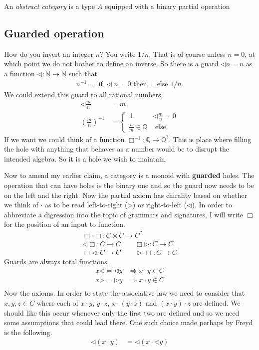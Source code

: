 \documentclass[12pt,twoside,letterpaper]{memoir}
\begin{document}
An \emph{abstract category} is a type $A$ equipped with a binary 
partial operation 

\subsection{Guarded operation}
How do you invert an integer $n$?  You write $1/n$.  That is of course 
unless $n=0$, at which point we do not bother to define an inverse.
So there is a guard $\lhd n=n$ as a function $\lhd:\mathbb{N}\to \mathbb{N}$ such that 
\begin{align*}
    n^{-1} = \text{ if }\lhd n=0 \text{ then } \bot \text{ else } 1/n.
\end{align*}
We could extend this guard to all rational numbers 
\begin{align*}
    \lhd \frac{m}{n} & = m \\
    \left(\frac{m}{n}\right)^{-1} & =
    \begin{cases}
        \bot & \lhd \frac{m}{n} = 0\\
        \frac{n}{m}\in \mathbb{Q} & \text{ else.}
    \end{cases}
\end{align*}
If we want we could think of a function $\Box^{-1}:\mathbb{Q}\to \mathbb{Q}^?$.
This is place where filling the hole with anything that behaves as a number would be to disrupt the intended algebra.  So it is a hole we wish to maintain.

Now to amend my earlier claim, a category is a monoid with \textbf{guarded} holes.  The operation that can have holes is the binary one and so the guard 
now needs to be on the left and the right. 
Now the partial axiom has chirality based on whether we think of $\cdot$ as 
to be read left-to-right ($\rhd$) or right-to-left ($\lhd$).
In order to abbreviate a digression into the topic of grammars and 
signatures, I will write $\Box$ for the position of an input to function.
\begin{gather}
    \tag{Product}
    \Box \cdot \Box : C\times C\to C^?\\
    \tag{Source}
    \lhd \Box :C\to C \qquad \Box\rhd: C\to C\\
    \tag{Target}
    \Box\lhd :C\to C \qquad \rhd\Box :C\to C
\end{gather}
Guards are always total functions.
\begin{align*}
    \tag{Left2Right}
    x\lhd = \lhd y & \Rightarrow x\cdot y \in C\\
    \tag{Right2Left}
    x\rhd = \rhd y & \Rightarrow x\cdot y \in C\\    
\end{align*}
Now the axioms.  In order to state the associative law 
we need to consider that $x,y,z\in C$ where 
each of $x\cdot y$, $y\cdot z$, $x\cdot (y\cdot z)$ and 
$(x\cdot y)\cdot z$ are defined.  We should like this occur 
whenever only the first two are defined and so we need some 
assumptions that could lead there.  One such choice made perhaps by 
Freyd is the following.
\begin{align*}
    \lhd(x\cdot y) & = \lhd(x \cdot \lhd y)
\end{align*}
\end{document}
